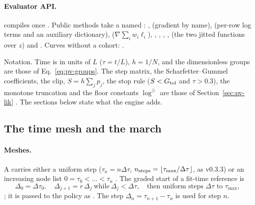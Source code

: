 \paragraph{Evaluator API.}  compiles once . Public methods
take a named : ,  (gradient by name),  (per-row log
terms and an auxiliary dictionary),  ($\nabla\sum_iw_i\ell_i$), ,
, , ,  (the two jitted functions over $z$) and
. Curves without a cohort:  .

Notation. Time is in units of $L$ ($\tau=t/L$), $h=1/N$, and the dimensionless groups are those of
Eq.~\eqref{eq:pv-groups}. The step matrix, the Scharfetter--Gummel coefficients, the clip, $S=h\sum_jp_j$, the
stop rule ($S<G_{\rm tol}$ and $\tau>0.3$), the monotone truncation and the floor constants
$\log^{\ge}$ are those of Section~\ref{sec:pv-lik}
. The sections below state what the engine adds.

\subsection{The time mesh and the march}\label{sec:fp-mesh}

\paragraph{Meshes.} A  carries either a uniform step ($\tau_n=n\Delta\tau$, $n_{\rm steps}=\lfloor
\tau_{\max}/\Delta\tau\rfloor$, as v0.3.3) or an increasing node list $0=\tau_0<\dots<\tau_{n}$
. The graded start of a fit-time reference is
\begin{equation}
  \Delta_0=\Delta\tau_0,\quad\Delta_{j+1}=r\,\Delta_j\ \text{while}\ \Delta_j<\Delta\tau,\quad\text{then uniform steps }\Delta\tau\text{ to }\tau_{\max},
\end{equation}
; it is passed to the policy  as . The step
$\Delta_n=\tau_{n+1}-\tau_n$ is used for step $n$.

